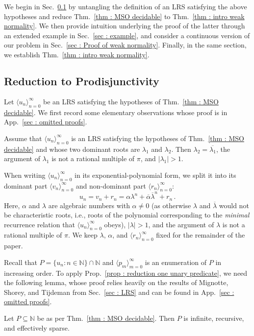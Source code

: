 \documentclass[a4paper,UKenglish,cleveref, autoref, thm-restate]{lipics-v2021}
\newcommand{\nat} {\mathbb{N}}
\begin{document}
We begin in Sec.~\ref{sec : Reduction to proving weak normality} by
untangling the definition of an LRS satisfying the above hypotheses
and reduce Thm.~\ref{thm : MSO decidable} to Thm.~\ref{thm : intro
  weak normality}.  We then provide intuition underlying the proof of
the latter through an extended example in Sec.~\ref{sec : example}, and
consider a continuous version of our problem in Sec.~\ref{sec : Proof of
  weak normality}.  Finally, in the same section, we establish
Thm.~\ref{thm : intro weak normality}.

\subsection{Reduction to Prodisjunctivity}\label{sec : Reduction to proving weak normality}

Let $\langle u_n\rangle_{n=0}^\infty$ be an LRS satisfying the
hypotheses of Thm.~\ref{thm : MSO decidable}. We first record some elementary observations whose proof is in App.~\ref{sec : omitted proofs}.
\begin{lemma}\label{lem : dominant roots are nice}
  Assume that $\langle u_n\rangle_{n=0}^\infty$ is an LRS satisfying the hypotheses of
  Thm.~\ref{thm : MSO decidable} and whose two dominant roots are $\lambda_1$ and
  $\lambda_2$. Then $\lambda_2 = \overline{\lambda_1}$,
the argument of $\lambda_1$ is not a rational multiple of $\pi$, and $|\lambda_1| > 1$.
\end{lemma}


When writing $\langle u_n\rangle_{n=0}^\infty$ in its
exponential-polynomial form, we split it into its dominant part
$\langle v_n\rangle_{n=0}^\infty$ and non-dominant part $\langle r_n\rangle_{n=0}^\infty$:
\begin{equation}\label{eq : def u_n and v_n}
    u_n = v_n + r_n = \alpha\lambda^n +
    \overline{\alpha}\overline{\lambda}^n + r_n \, .
\end{equation}
Here, $\alpha$ and $\lambda$ are algebraic numbers with $\alpha \ne 0$
(as otherwise $\lambda$ and $\overline{\lambda}$ would not be
characteristic roots, i.e., roots of the polynomial corresponding to
the \emph{minimal} recurrence relation that
$\langle u_n\rangle_{n=0}^\infty$ obeys), $|\lambda| > 1$, and
the argument of $\lambda$ is not a rational multiple of $\pi$.
We keep $\lambda$, $\alpha$, and $\langle r_n\rangle_{n=0}^\infty$ fixed for the remainder of the paper.

Recall that $P = \{u_n \colon n \in \nat\} \cap \nat$ and
$\langle p_m\rangle_{m=0}^\infty$ is an enumeration of $P$ in
increasing order.
To apply Prop.~\ref{prop : reduction one unary predicate}, we need the following lemma, whose proof relies heavily on the results of Mignotte, Shorey, and Tijdeman from Sec.~\ref{sec : LRS} and can be found in App.~\ref{sec : omitted proofs}.
\begin{lemma}\label{lem : First three conditions of LRS}
Let $P \subseteq \nat$ be as per Thm.~\ref{thm : MSO decidable}.
Then $P$ is infinite, recursive, and effectively sparse.
\end{lemma}
\end{document}
